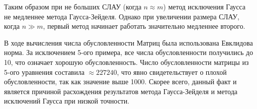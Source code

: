 \documentclass[a4paper]{article}
\begin{document}
Таким образом при не больших СЛАУ (когда $n \approx m$) метод исключения Гаусса не медленнее метода Гаусса-Зейделя. Однако при увеличении размера СЛАУ, когда $n \gg m$, первый метод начинает работать значительно медленнее второго.

\bigskip

В ходе вычисления числа обусловленности Матриц была использована Евклидова норма. За исключением 5-ого примера, все числа обусловленности получились до 10, что означает хорошую обусловленность.
Число обусловленности матрицы из 5-ого уравнения составила $\approx 227240$, что явно свидетельствует о плохой обусловленности, так как значение выше 1000. Скорее всего, данный факт и является причиной расхождения результатов метода Гаусса-Зейделя и метода исключений Гаусса при низкой точности.
\end{document}
